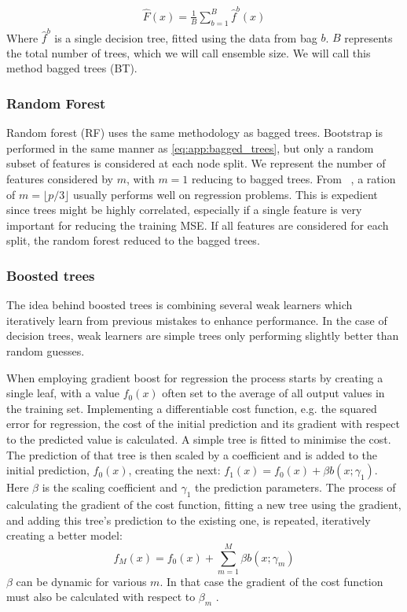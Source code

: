                 \begin{align}
                    \hat{F}(x) = \frac{1}{B}\sum_{b = 1}^{B} \hat{f}^b (x) \label{eq:app:bagged_trees}
                \end{align}
                Where $\hat{f}^b$ is a single decision tree, fitted using the data from bag $b$. $B$ represents the total number of trees, which we will call ensemble size. We will call this method bagged trees (BT).

            \subsubsection{Random Forest}
                Random forest (RF) uses the same methodology as bagged trees. Bootstrap is performed in the same manner as \cref{eq:app:bagged_trees}, but only a random subset of features is considered at each node split. We represent the number of features considered by $m$, with $m = 1$ reducing to bagged trees. From ~\citep{hastie01statisticallearning}, a ration of $m = \lfloor p/3 \rfloor$ usually performs well on regression problems. This is expedient since trees might be highly correlated, especially if a single feature is very important for reducing the training MSE. If all features are considered for each split, the random forest reduced to the bagged trees.
            
            \subsubsection{Boosted trees}
                The idea behind boosted trees is combining several weak learners which iteratively learn from previous mistakes to enhance performance. In the case of decision trees, weak learners are simple trees only performing slightly better than random guesses. 

                When employing gradient boost for regression the process starts by creating a single leaf, with a value $f_0(x)$ often set to the average of all output values in the training set. Implementing a differentiable cost function, e.g. the squared error for regression, the cost of the initial prediction and its gradient with respect to the predicted value is calculated. A simple tree is fitted to minimise the cost. The prediction of that tree is then scaled by a coefficient and is added to the initial prediction, $f_0(x)$, creating the next: $f_1(x) = f_0(x) + \beta b(x;\gamma_1)$. Here $\beta$ is the scaling coefficient and $\gamma_1$ the prediction parameters. The process of calculating the gradient of the cost function, fitting a new tree using the gradient, and adding this tree's prediction to the existing one, is repeated, iteratively creating a better model: 
                \begin{equation}
                    f_M(x) = f_0(x) + \sum_{m=1}^M \beta b(x; \gamma_m)
                \end{equation}
                $\beta$ can be dynamic for various $m$. In that case the gradient of the cost function must also be calculated with respect to $\beta_m$ \citep{hastie01statisticallearning}. 

